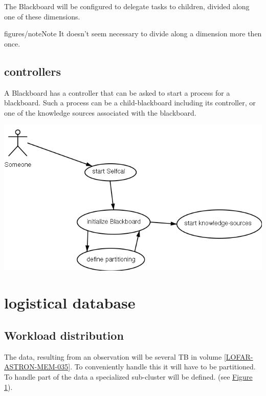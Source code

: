 \documentclass[]{lofar}
\begin{document}
    The Blackboard will be configured to delegate tasks to children,
    divided along one of these dimensions.
\begin{admonition}{figures/note}{Note}%
It doesn't seem
    necessary to divide along a dimension more then once.\end{admonition}



\subsection{controllers}
\label{id2721330}\hypertarget{id2721330}{}%



    A Blackboard has a controller that can be asked to start a process
    for a blackboard. Such a process can be a child-blackboard
    including its controller, or one of the knowledge sources
    associated with the blackboard.

   
{{\includegraphics[]{start.usecase.png}}}


\section{logistical database}
\label{logistical datamodel}\hypertarget{logistical datamodel}{}%

\subsection{Workload distribution}
\label{id2721376}\hypertarget{id2721376}{}%



    The data, resulting from an observation will be several TB in
    volume \hyperlink{LOFAR-ASTRON-MEM-035}{[LOFAR-ASTRON-MEM-035]}. To
    conveniently handle this it will have to be partitioned. To handle
    part of the data a specialized sub-cluster will be defined. (see \hyperlink{subcluster}{Figure 1}).
\end{document}
